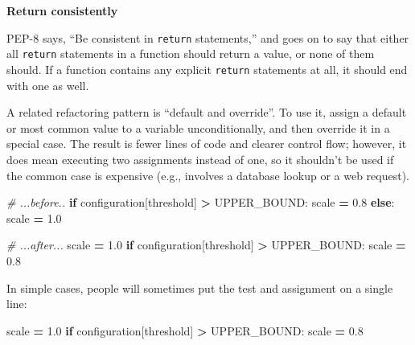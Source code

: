 \documentclass[
]{krantz}
\makeatletter
\newenvironment{Shaded}{\begin{snugshade}}{\end{snugshade}}
\newcommand{\CommentTok}[1]{\textcolor[rgb]{0.56,0.35,0.01}{\textit{#1}}}
\newcommand{\ControlFlowTok}[1]{\textcolor[rgb]{0.13,0.29,0.53}{\textbf{#1}}}
\newcommand{\FloatTok}[1]{\textcolor[rgb]{0.00,0.00,0.81}{#1}}
\newcommand{\NormalTok}[1]{#1}
\newcommand{\OperatorTok}[1]{\textcolor[rgb]{0.81,0.36,0.00}{\textbf{#1}}}
\newcommand{\StringTok}[1]{\textcolor[rgb]{0.31,0.60,0.02}{#1}}
\renewenvironment{quote}{\begin{VF}}{\end{VF}}
\newenvironment{kframe}{%
\medskip{}
\setlength{\fboxsep}{.8em}
 \def\at@end@of@kframe{}%
 \ifinner\ifhmode%
  \def\at@end@of@kframe{\end{minipage}}%
  \begin{minipage}{\columnwidth}%
 \fi\fi%
 \def\FrameCommand##1{\hskip\@totalleftmargin \hskip-\fboxsep
 \colorbox{shadecolor}{##1}\hskip-\fboxsep
     \hskip-\linewidth \hskip-\@totalleftmargin \hskip\columnwidth}%
 \MakeFramed {\advance\hsize-\width
   \@totalleftmargin\z@ \linewidth\hsize
   \@setminipage}}%
 {\par\unskip\endMakeFramed%
 \at@end@of@kframe}
\renewenvironment{Shaded}{\begin{kframe}}{\end{kframe}}
\makeatother
\begin{document}
\begin{quote}
\textbf{Return consistently}

PEP-8 says, ``Be consistent in \texttt{return} statements,''
and goes on to say that either all \texttt{return} statements in a function should return a value,
or none of them should.
If a function contains any explicit \texttt{return} statements at all,
it should end with one as well.
\end{quote}

A related refactoring pattern is ``default and override''.
To use it,
assign a default or most common value to a variable unconditionally,
and then override it in a special case.
The result is fewer lines of code and clearer control flow;
however,
it does mean executing two assignments instead of one,
so it shouldn't be used if the common case is expensive
(e.g., involves a database lookup or a web request).

\begin{Shaded}
\begin{Highlighting}[]
\CommentTok{\# ...before..}
\ControlFlowTok{if}\NormalTok{ configuration[}\StringTok{\textquotesingle{}threshold\textquotesingle{}}\NormalTok{] }\OperatorTok{\textgreater{}}\NormalTok{ UPPER\_BOUND:}
\NormalTok{    scale }\OperatorTok{=} \FloatTok{0.8}
\ControlFlowTok{else}\NormalTok{:}
\NormalTok{    scale }\OperatorTok{=} \FloatTok{1.0}
\end{Highlighting}
\end{Shaded}

\begin{Shaded}
\begin{Highlighting}[]
\CommentTok{\# ...after...}
\NormalTok{scale }\OperatorTok{=} \FloatTok{1.0}
\ControlFlowTok{if}\NormalTok{ configuration[}\StringTok{\textquotesingle{}threshold\textquotesingle{}}\NormalTok{] }\OperatorTok{\textgreater{}}\NormalTok{ UPPER\_BOUND:}
\NormalTok{    scale }\OperatorTok{=} \FloatTok{0.8}
\end{Highlighting}
\end{Shaded}

In simple cases,
people will sometimes put the test and assignment on a single line:

\begin{Shaded}
\begin{Highlighting}[]
\NormalTok{scale }\OperatorTok{=} \FloatTok{1.0}
\ControlFlowTok{if}\NormalTok{ configuration[}\StringTok{\textquotesingle{}threshold\textquotesingle{}}\NormalTok{] }\OperatorTok{\textgreater{}}\NormalTok{ UPPER\_BOUND: scale }\OperatorTok{=} \FloatTok{0.8}
\end{Highlighting}
\end{Shaded}
\end{document}
